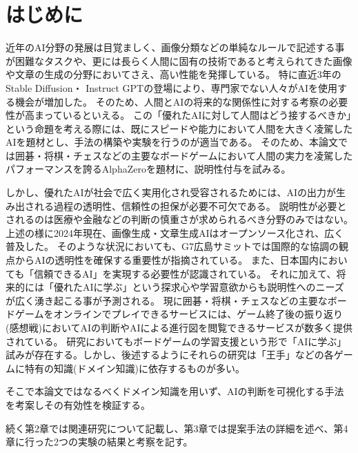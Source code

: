 \chapter{はじめに}
近年のAI分野の発展は目覚ましく、画像分類などの単純なルールで記述する事が困難なタスクや、更には長らく人間に固有の技術であると考えられてきた画像や文章の生成の分野においてさえ、高い性能を発揮している\cite{cat}。
特に直近3年のStable Diffusion\cite{diffusion}・ Instruct GPT\cite{GPT}の登場により、専門家でない人々がAIを使用する機会が増加した。
そのため、人間とAIの将来的な関係性に対する考察の必要性が高まっているといえる。
この「優れたAIに対して人間はどう接するべきか」という命題を考える際には、既にスピードや能力において人間を大きく凌駕したAIを題材とし、手法の構築や実験を行うのが適当である。
そのため、本論文では囲碁・将棋・チェスなどの主要なボードゲームにおいて人間の実力を凌駕したパフォーマンスを誇るAlphaZero\cite{AlphaZero}を題材に、説明性付与を試みる。

しかし、優れたAIが社会で広く実用化され受容されるためには、AIの出力が生み出される過程の透明性、信頼性の担保が必要不可欠である。
説明性が必要とされるのは医療や金融などの判断の慎重さが求められるべき分野のみではない。上述の様に2024年現在、画像生成・文章生成AIはオープンソース化され、広く普及した。
そのような状況においても、G7広島サミットでは国際的な協調の観点からAIの透明性を確保する重要性が指摘されている\cite{Hiroshima}。
また、日本国内においても「信頼できるAI」を実現する必要性が認識されている\cite{グランドデザイン}。
それに加えて、将来的には「優れたAIに学ぶ」という探求心や学習意欲からも説明性へのニーズが広く湧き起こる事が予測される。
現に囲碁・将棋・チェスなどの主要なボードゲームをオンラインでプレイできるサービスには、ゲーム終了後の振り返り(感想戦)においてAIの判断やAIによる進行図を閲覧できるサービスが数多く提供されている\cite{panda}\cite{wars}。
研究においてもボードゲームの学習支援という形で「AIに学ぶ」試みが存在する。しかし、後述するようにそれらの研究は「王手」などの各ゲームに特有の知識(ドメイン知識)に依存するものが多い。

そこで本論文ではなるべくドメイン知識を用いず、AIの判断を可視化する手法を考案しその有効性を検証する。

続く第2章では関連研究について記載し、第3章では提案手法の詳細を述べ、第4章に行った2つの実験の結果と考察を記す。

